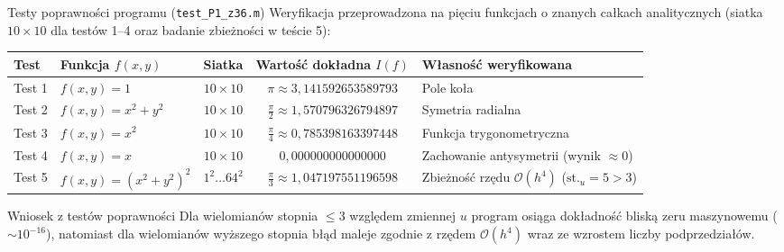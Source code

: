 \documentclass[aspectratio=169, 10pt, xcolor={table}]{beamer}
\begin{document}
\begin{frame}{Testy poprawności programu (\texttt{test\_P1\_z36.m})}
  Weryfikacja przeprowadzona na pięciu funkcjach o znanych całkach analitycznych (siatka $10 \times 10$ dla testów 1--4 oraz badanie zbieżności w teście 5):

  \vspace{0.2cm}
  \begin{table}
    \centering
    \small
    \begin{tabular}{@{} l l c c l @{}}
      \toprule
      \textbf{Test} & \textbf{Funkcja $f(x,y)$} & \textbf{Siatka} & \textbf{Wartość dokładna $I(f)$} & \textbf{Własność weryfikowana} \\
      \midrule
      Test 1 & $f(x,y) = 1$ & $10 \times 10$ & $\pi \approx 3{,}141592653589793$ & Pole koła \\
      Test 2 & $f(x,y) = x^2 + y^2$ & $10 \times 10$ & $\frac{\pi}{2} \approx 1{,}570796326794897$ & Symetria radialna \\
      Test 3 & $f(x,y) = x^2$ & $10 \times 10$ & $\frac{\pi}{4} \approx 0{,}785398163397448$ & Funkcja trygonometryczna \\
      Test 4 & $f(x,y) = x$ & $10 \times 10$ & $0{,}000000000000000$ & Zachowanie antysymetrii (wynik $\approx 0$) \\
      Test 5 & $f(x,y) = (x^2+y^2)^2$ & $1^2 \dots 64^2$ & $\frac{\pi}{3} \approx 1{,}047197551196598$ & Zbieżność rzędu $\mathcal{O}(h^4)$ ($\text{st.}_u = 5 > 3$) \\
      \bottomrule
    \end{tabular}
  \end{table}

  \vspace{0.15cm}
  \begin{block}{Wniosek z testów poprawności}
    Dla wielomianów stopnia $\le 3$ względem zmiennej $u$ program osiąga dokładność bliską zeru maszynowemu ($\sim 10^{-16}$), natomiast dla wielomianów wyższego stopnia błąd maleje zgodnie z rzędem $\mathcal{O}(h^4)$ wraz ze wzrostem liczby podprzedziałów.
  \end{block}
\end{frame}
\end{document}

